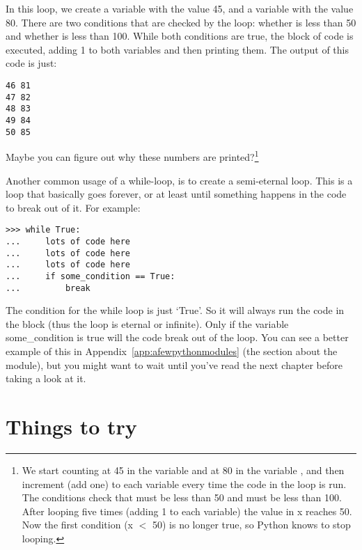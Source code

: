 In this loop, we create a variable  with the value 45, and a variable  with the value 80.  There are two conditions that are checked by the loop: whether  is less than 50 and whether  is less than 100. While both conditions are true, the block of code is executed, adding 1 to both variables and then printing them. The output of this code is just:

\begin{listing}
\begin{verbatim}
46 81
47 82
48 83
49 84
50 85
\end{verbatim}
\end{listing}

Maybe you can figure out why these numbers are printed?\footnote{We start counting at 45 in the variable  and at 80 in the variable , and then increment (add one) to each variable every time the code in the loop is run.  The conditions check that  must be less than 50 and  must be less than 100.  After looping five times (adding 1 to each variable) the value in x reaches 50.  Now the first condition (x $<$ 50) is no longer true, so Python knows to stop looping.}

Another common usage of a while-loop, is to create a semi-eternal loop. This is a loop that basically goes forever, or at least until something happens in the code to break out of it. For example:

\begin{listingignore}
\begin{verbatim}
>>> while True:
...     lots of code here
...     lots of code here
...     lots of code here
...     if some_condition == True:
...         break
\end{verbatim}
\end{listingignore}

The condition for the while loop is just `True'.  So it will always run the code in the block (thus the loop is eternal or infinite). Only if the variable some\_condition is true will the code break out of the loop.  You can see a better example of this in Appendix~\ref{app:afewpythonmodules} (the section about the  module), but you might want to wait until you've read the next chapter before taking a look at it.

\section{Things to try}

